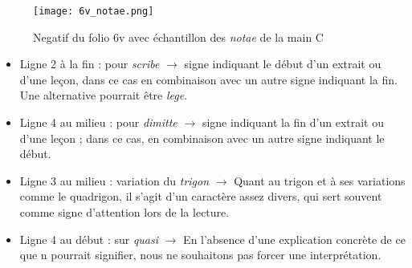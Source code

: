 \documentclass[a4paper, twoside, 12pt]{book}
\begin{document}
\begin{figure}[H]
    \centering
    \texttt{[image: 6v\_notae.png]}
    \caption{Negatif du folio 6v avec échantillon des \textit{notae} de la main C }
\end{figure}

\begin{itemize}
    \item Ligne 2 à la fin :   pour \textit{scribe} $\rightarrow$ signe indiquant le début d'un extrait ou d'une leçon, dans ce cas en combinaison avec un autre signe indiquant la fin. Une alternative pourrait être \textit{lege}.
    \item Ligne 4 au milieu :   pour \textit{dimitte} $\rightarrow$ signe indiquant la fin d'un extrait ou d'une leçon ; dans ce cas, en combinaison avec un autre signe indiquant le début.
    \item Ligne 3 au milieu : variation du \textit{trigon} $\rightarrow$ Quant au trigon et à ses variations comme le quadrigon, il s'agit d'un caractère assez divers, qui sert souvent comme signe d'attention lors de la lecture. 
     \item Ligne 4 au début :   sur \textit{quasi} $\rightarrow$ En l'absence d'une explication concrète de ce que \og{}n\fg{} pourrait signifier, nous ne souhaitons pas forcer une interprétation.

\end{itemize}
\end{document}
